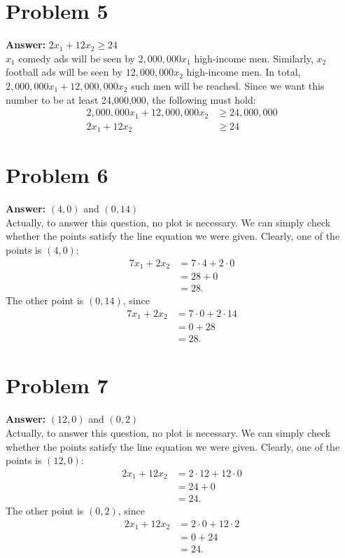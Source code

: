 \documentclass[11pt]{article}
\begin{document}
\section*{Problem 5}
\label{sec:orgbb88d98}

\textbf{Answer:} \(2x_1+12x_2\geq 24\)\\

\(x_1\) comedy ads will be seen by \(2,000,000x_1\) high-income men.
Similarly, \(x_2\) football ads will be seen by \(12,000,000x_2\)
high-income men. In total, \(2,000,000x_1+12,000,000x_2\) such men will be
reached. Since we want this number to be at least 24,000,000, the following must
hold:
\begin{align*}
  2,000,000x_1+12,000,000x_2&\geq 24,000,000\\
  2x_1+12x_2&\geq 24
\end{align*}
\section*{Problem 6}
\label{sec:org2919656}

\textbf{Answer:} \((4,0)\) and \((0,14)\)\\

Actually, to answer this question, no plot is necessary. We can simply check
whether the points satisfy the line equation we were given. Clearly, one of the
points is \((4,0)\):
\begin{align*}
  7x_1+2x_2&=7\cdot 4+2\cdot 0\\
  &=28+0\\
  &=28.
\end{align*}
The other point is \((0,14)\), since
\begin{align*}
  7x_1+2x_2&=7\cdot 0+2\cdot 14\\
  &=0+28\\
  &=28.
\end{align*}
\section*{Problem 7}
\label{sec:org022b47d}

\textbf{Answer:} \((12,0)\) and \((0,2)\)\\

Actually, to answer this question, no plot is necessary. We can simply check
whether the points satisfy the line equation we were given. Clearly, one of the
points is \((12,0)\):
\begin{align*}
  2x_1+12x_2&=2\cdot 12+12\cdot 0\\
  &=24+0\\
  &=24.
\end{align*}
The other point is \((0,2)\), since
\begin{align*}
  2x_1+12x_2&=2\cdot 0+12\cdot 2\\
  &=0+24\\
  &=24.
\end{align*}
\end{document}
